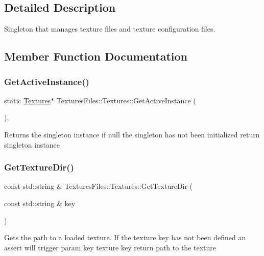 \subsection{Detailed Description}
Singleton that manages texture files and texture configuration files. 

\subsection{Member Function Documentation}
\mbox{\label{class_textures_files_1_1_textures_a32625c0cb26cc63df0b62b2be30994fd}} 
\subsubsection{\texorpdfstring{GetActiveInstance()}{GetActiveInstance()}}
{\footnotesize\ttfamily static \mbox{\hyperlink{class_textures_files_1_1_textures}{Textures}}$\ast$ Textures\+Files\+::\+Textures\+::\+Get\+Active\+Instance (\begin{DoxyParamCaption}{ }\end{DoxyParamCaption})\hspace{0.3cm}{\ttfamily [inline]}, {\ttfamily [static]}}

Returns the singleton instance if null the singleton has not been initialized return singleton instance \mbox{\label{class_textures_files_1_1_textures_ae484783c9a26a493e649cc5ccff166de}} 
\subsubsection{\texorpdfstring{GetTextureDir()}{GetTextureDir()}}
{\footnotesize\ttfamily const std\+::string \& Textures\+Files\+::\+Textures\+::\+Get\+Texture\+Dir (\begin{DoxyParamCaption}\item[{const std\+::string \&}]{key }\end{DoxyParamCaption})}

Gets the path to a loaded texture. If the texture key has not been defined an assert will trigger param key texture key return path to the texture \mbox{\label{class_textures_files_1_1_textures_a76d7462b113235e27422e143bde5e527}} 
